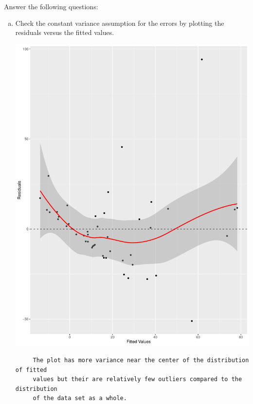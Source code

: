 \documentclass[12pt,letterpaper]{article}
\begin{document}
\vspace{.5cm}
  
\vspace{.5cm}
Answer the following questions:
\vspace{.5cm}
\begin{enumerate}[(a)]
	 \item Check the constant variance assumption for the errors by plotting the residuals versus the fitted values. \newpage
	 
	 \includegraphics[width=.75\textwidth]{variancecheck.pdf}
	 \begin{verbatim}
	 The plot has more variance near the center of the distribution of fitted 
	 values but their are relatively few outliers compared to the distribution
	 of the data set as a whole.
	 \end{verbatim}
	 

\end{enumerate}
\end{document}
